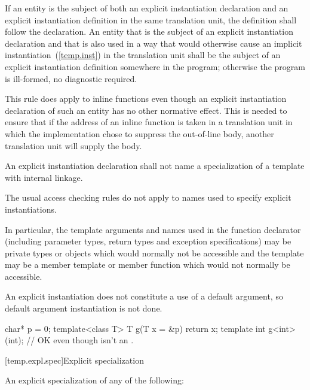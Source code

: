 \pnum
If an entity is the subject of both an explicit instantiation declaration
and an explicit instantiation definition in the same translation unit, the
definition shall follow the declaration. An entity that is the subject of an
explicit instantiation declaration and that is also used
in a way that would otherwise cause an implicit instantiation~(\ref{temp.inst})
in the translation unit
shall be the subject of an explicit instantiation definition somewhere in the
program; otherwise the program is ill-formed, no diagnostic required.
\begin{note} This rule does apply to inline functions even though an
explicit instantiation declaration of such an entity has no other normative
effect. This is needed to ensure that if the address of an inline function is
taken in a translation unit in which the implementation chose to suppress the
out-of-line body, another translation unit will supply the body.\end{note}
An explicit instantiation declaration shall not name a specialization of a
template with internal linkage.



\pnum
The usual access checking rules do not apply to names used to specify
explicit instantiations.
\begin{note}
In particular, the template arguments and names used in the function
declarator (including parameter types, return types and exception
specifications) may be private types or objects which would normally
not be accessible and the template may be a member template or member
function which would not normally be accessible.
\end{note}

\pnum
An explicit instantiation does not constitute a use of a default argument,
so default argument instantiation is not done.
\begin{example}

\begin{codeblock}
char* p = 0;
template<class T> T g(T x = &p) { return x; }
template int g<int>(int);       // OK even though  isn't an .
\end{codeblock}
\end{example}

[temp.expl.spec]{Explicit specialization}

\pnum
{}%
An explicit specialization of any of the following:

